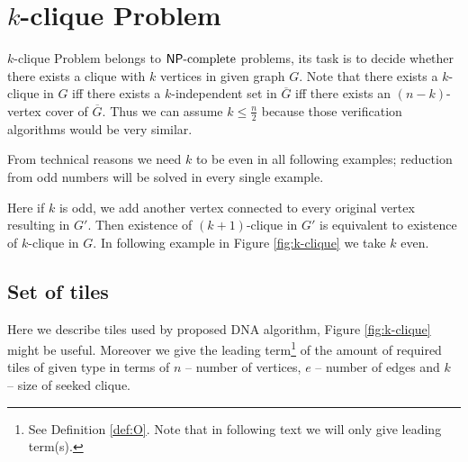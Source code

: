 \section{$k$-clique Problem}

$k$-clique Problem belongs to $\mathsf{NP}\textnormal{-complete}$ problems, its task is to decide whether there exists a clique with $k$ vertices in given graph $G$. Note that there exists a $k$-clique in $G$ iff there exists a $k$-independent set in $\overline{G}$ iff there exists an $(n-k)$-vertex cover of $\overline{G}$. Thus we can assume $k \leq \frac{n}{2}$ because those verification algorithms would be very similar.

From technical reasons we need $k$ to be even in all following examples; reduction from odd numbers will be solved in every single example.

Here if $k$ is odd, we add another vertex connected to every original vertex resulting in $G'$. Then existence of $(k+1)$-clique in $G'$ is equivalent to existence of $k$-clique in $G$. In following example in Figure \ref{fig:k-clique} we take $k$ even.


\subsection*{Set of tiles}

Here we describe tiles used by proposed DNA algorithm, Figure \ref{fig:k-clique} might be useful. Moreover we give the leading term\footnote{See Definition \ref{def:O}. Note that in following text we will only give leading term(s).} of the amount of required tiles of given type in terms of $n$ -- number of vertices, $e$ -- number of edges and $k$ -- size of seeked clique.

